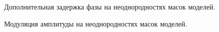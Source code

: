 \begin{figure}[h]
	\caption{Дополнительная задержка фазы на неоднородностях масок моделей.}
	\label{ris:ModelPhase}
\end{figure}
\begin{figure}[h]
	\caption{Модуляция амплитуды на неоднородностях масок моделей.}
	\label{ris:ModelAmplitude}
\end{figure}
